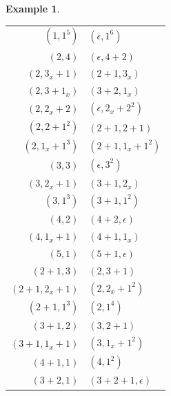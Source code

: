 \documentclass[11pt,reqno]{amsart}
\numberwithin{equation}{section}
\theoremstyle{plain}
\theoremstyle{definition}
\newtheorem{example}[theorem]{Example}
\theoremstyle{named}
\begin{document}
\begin{example}
\begin{minipage}[c]{0.5\textwidth}
\begin{tabular}{r|l}
$(1, 1^5)$ & $(\epsilon, 1^6)$\\
$(2, 4)$ & $(\epsilon, 4+2)$\\
$(2, 3_x+1)$ & $(2+1, 3_x)$\\
$(2, 3+1_x)$ & $(3+2, 1_x)$\\
$(2, 2_x+2)$ & $(\epsilon, 2_x+2^2)$\\
$(2, 2+1^2)$ & $(2+1, 2+1)$\\
$(2, 1_x+1^3)$ & $(2+1, 1_x+1^2)$\\
$(3, 3)$ & $(\epsilon, 3^2)$\\
$(3, 2_x+1)$ & $(3+1, 2_x)$\\
$(3, 1^3)$ & $(3+1, 1^2)$\\
$(4, 2)$ & $(4+2, \epsilon)$\\
$(4, 1_x+1)$ & $(4+1, 1_x)$\\
$(5, 1)$ & $(5+1, \epsilon)$\\
$(2+1, 3)$ & $(2, 3+1)$\\
$(2+1, 2_x+1)$ & $(2, 2_x+1^2)$\\
$(2+1, 1^3)$ & $(2, 1^4)$\\
$(3+1, 2)$ & $(3, 2+1)$\\
$(3+1, 1_x+1)$ & $(3, 1_x+1^2)$\\
$(4+1, 1)$ & $(4, 1^2)$\\
$(3+2, 1)$ & $(3+2+1, \epsilon)$\\
\end{tabular}
\end{minipage}
\end{example}
\end{document}
